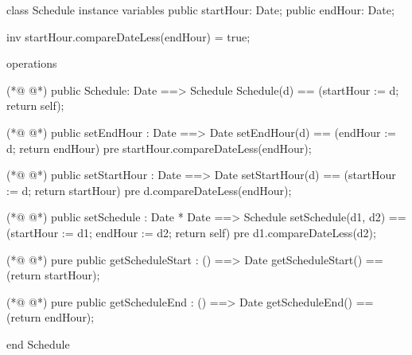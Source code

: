 \begin{vdmpp}[breaklines=true]
class Schedule
instance variables
  public startHour: Date;
  public endHour: Date;
  
  inv startHour.compareDateLess(endHour) = true;

operations

(*@
\label{Schedule:10}
@*)
 public Schedule: Date ==> Schedule
  Schedule(d) == (startHour := d; return self);
 
(*@
\label{setEndHour:13}
@*)
 public setEndHour : Date ==> Date
  setEndHour(d) == (endHour := d; return endHour)
 pre startHour.compareDateLess(endHour);
  
(*@
\label{setStartHour:17}
@*)
 public setStartHour : Date ==> Date
  setStartHour(d) == (startHour := d; return startHour)
 pre d.compareDateLess(endHour);
 
(*@
\label{setSchedule:21}
@*)
 public setSchedule : Date * Date ==> Schedule
  setSchedule(d1, d2) == (startHour := d1; endHour := d2; return self)
 pre d1.compareDateLess(d2);
  
(*@
\label{getScheduleStart:25}
@*)
 pure public getScheduleStart : () ==> Date
  getScheduleStart() == (return startHour);
  
(*@
\label{getScheduleEnd:28}
@*)
 pure public getScheduleEnd : () ==> Date
  getScheduleEnd() == (return endHour);

end Schedule
\end{vdmpp}
